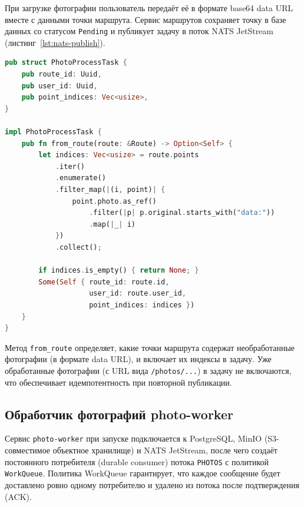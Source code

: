 При загрузке фотографии пользователь передаёт её в формате base64 data URL вместе с данными точки маршрута. Сервис маршрутов сохраняет точку в базе данных со статусом \texttt{Pending} и публикует задачу в поток NATS JetStream (листинг~\ref{lst:nats-publish}).

\begin{lstlisting}[language=Rust, caption={Публикация задачи обработки фото в NATS}, label={lst:nats-publish}]
pub struct PhotoProcessTask {
    pub route_id: Uuid,
    pub user_id: Uuid,
    pub point_indices: Vec<usize>,
}

impl PhotoProcessTask {
    pub fn from_route(route: &Route) -> Option<Self> {
        let indices: Vec<usize> = route.points
            .iter()
            .enumerate()
            .filter_map(|(i, point)| {
                point.photo.as_ref()
                    .filter(|p| p.original.starts_with("data:"))
                    .map(|_| i)
            })
            .collect();

        if indices.is_empty() { return None; }
        Some(Self { route_id: route.id,
                    user_id: route.user_id,
                    point_indices: indices })
    }
}
\end{lstlisting}

Метод \texttt{from\_route} определяет, какие точки маршрута содержат необработанные фотографии (в формате data URL), и включает их индексы в задачу. Уже обработанные фотографии (с URL вида \texttt{/photos/...}) в задачу не включаются, что обеспечивает идемпотентность при повторной публикации.

\subsection{Обработчик фотографий photo-worker}

Сервис \texttt{photo-worker} при запуске подключается к PostgreSQL, MinIO (S3-совместимое объектное хранилище) и NATS JetStream, после чего создаёт постоянного потребителя (durable consumer) потока \texttt{PHOTOS} с политикой \texttt{WorkQueue}. Политика WorkQueue гарантирует, что каждое сообщение будет доставлено ровно одному потребителю и удалено из потока после подтверждения (ACK).

